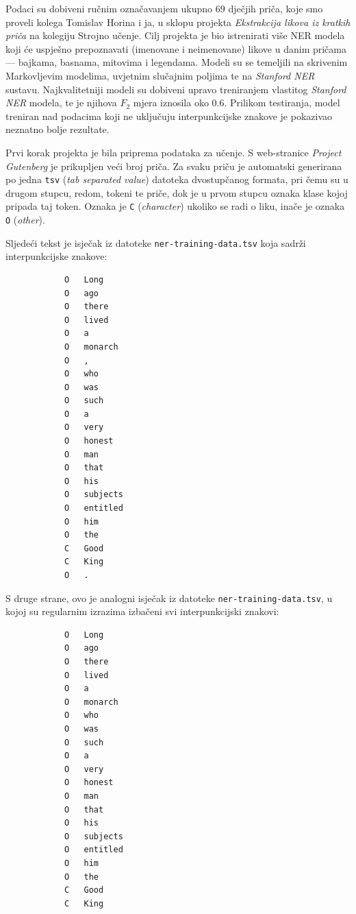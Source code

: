 \documentclass[a4paper,twoside,12pt]{memoir} %
\newcommand{\ti}[1]{\textit{#1\/}}
\begin{document}

		Podaci su dobiveni ručnim označavanjem ukupno $69$ dječjih priča, koje smo proveli kolega Tomislav Horina i ja, u sklopu projekta \ti{Ekstrakcija likova iz kratkih priča} na kolegiju Strojno učenje. Cilj projekta je bio istrenirati više NER modela koji će uspješno prepoznavati (imenovane i neimenovane) likove u danim pričama --- bajkama, basnama, mitovima i legendama. Modeli su se temeljili na skrivenim Markovljevim modelima, uvjetnim slučajnim poljima te na \ti{Stanford NER} sustavu. Najkvalitetniji modeli su dobiveni upravo treniranjem vlastitog \ti{Stanford NER} modela, te je njihova $F_2$ mjera iznosila oko $0.6$. Prilikom testiranja, model treniran nad podacima koji ne uključuju interpunkcijske znakove je pokazivao neznatno bolje rezultate.

		Prvi korak projekta je bila priprema podataka za učenje. S web-stranice \ti{Project Gutenberg} je prikupljen veći broj priča. Za svaku priču je automatski generirana po jedna \texttt{tsv} (\ti{tab separated value}) datoteka dvostupčanog formata, pri čemu su u drugom stupcu, redom, tokeni te priče, dok je u prvom stupcu oznaka klase kojoj pripada taj token. Oznaka je \texttt{C} (\ti{character}) ukoliko se radi o liku, inače je oznaka \texttt{O} (\ti{other}).

		Sljedeći tekst je isječak iz datoteke \texttt{ner-training-data.tsv} koja sadrži interpunkcijske znakove:

		\begin{lstlisting}
			O	Long
			O	ago
			O	there
			O	lived
			O	a
			O	monarch
			O	,
			O	who
			O	was
			O	such
			O	a
			O	very
			O	honest
			O	man
			O	that
			O	his
			O	subjects
			O	entitled
			O	him
			O	the
			C	Good
			C	King
			O	.
		\end{lstlisting}

		S druge strane, ovo je analogni isječak iz datoteke \texttt{ner-training-data.tsv}, u kojoj su regularnim izrazima izbačeni svi interpunkcijski znakovi:

		\begin{lstlisting}
			O	Long
			O	ago
			O	there
			O	lived
			O	a
			O	monarch
			O	who
			O	was
			O	such
			O	a
			O	very
			O	honest
			O	man
			O	that
			O	his
			O	subjects
			O	entitled
			O	him
			O	the
			C	Good
			C	King
		\end{lstlisting}
\end{document}

